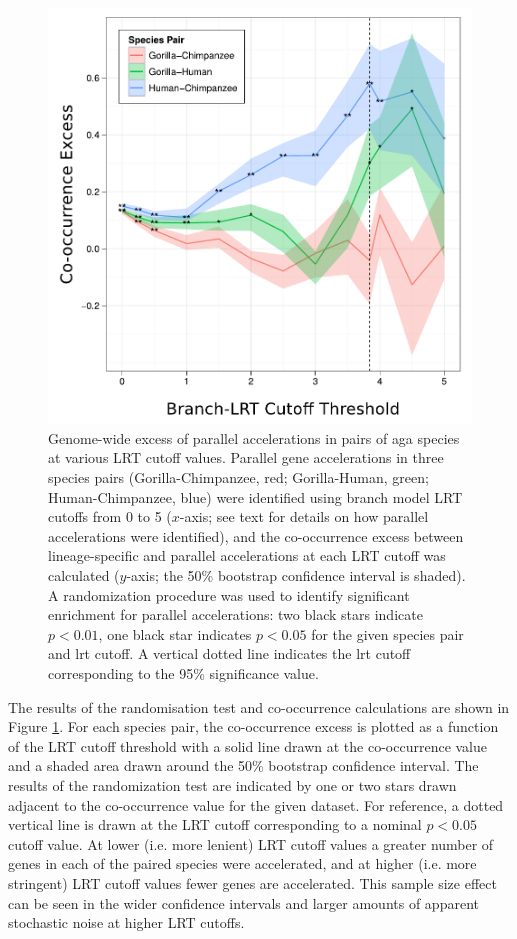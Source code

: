 \begin{figure}
\centering
\includegraphics[scale=0.7]{Figs/gorilla_parallel.pdf}
\caption{Genome-wide excess of parallel accelerations in pairs of
  \ac{aga} species at various LRT cutoff values. Parallel gene
  accelerations in three species pairs (Gorilla-Chimpanzee, red;
  Gorilla-Human, green; Human-Chimpanzee, blue) were identified using
  branch model LRT cutoffs from 0 to 5 ($x$-axis; see text for details
  on how parallel accelerations were identified), and the
  co-occurrence excess between lineage-specific and parallel
  accelerations at each LRT cutoff was calculated ($y$-axis; the 50\%
  bootstrap confidence interval is shaded). A randomization procedure
  was used to identify significant enrichment for parallel
  accelerations: two black stars indicate $p<0.01$, one black star
  indicates $p<0.05$ for the given species pair and \ac{lrt} cutoff. A
  vertical dotted line indicates the \ac{lrt} cutoff corresponding to
  the 95\% \chisq significance value.}
\label{fig_gorilla_parallel}
\end{figure}

The results of the randomisation test and co-occurrence calculations
are shown in Figure \ref{fig_gorilla_parallel}. For each species pair,
the co-occurrence excess is plotted as a function of the LRT cutoff
threshold with a solid line drawn at the co-occurrence value and a
shaded area drawn around the 50\% bootstrap confidence interval. The
results of the randomization test are indicated by one or two stars
drawn adjacent to the co-occurrence value for the given dataset. For
reference, a dotted vertical line is drawn at the LRT cutoff
corresponding to a nominal $p<0.05$ \chisq cutoff value. At lower
(i.e. more lenient) LRT cutoff values a greater number of genes in
each of the paired species were accelerated, and at higher (i.e. more
stringent) LRT cutoff values fewer genes are accelerated. This sample
size effect can be seen in the wider confidence intervals and larger
amounts of apparent stochastic noise at higher LRT cutoffs.

